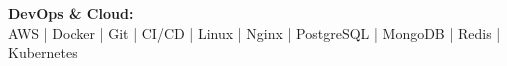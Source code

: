 \textbf{DevOps \& Cloud:} \\ AWS | Docker | Git | CI/CD | Linux | Nginx | PostgreSQL | MongoDB | Redis | Kubernetes